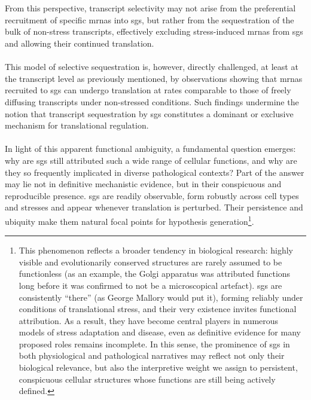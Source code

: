 \\
\\
From this perspective, transcript selectivity may not arise from the preferential recruitment of specific \glspl{mrna} into \glspl{sg}, but rather from the sequestration of the bulk of non-stress transcripts\cite{glauninger_transcriptome-wide_2025}, effectively excluding stress-induced \glspl{mrna} from \glspl{sg} and allowing their continued translation\cite{glauninger_transcriptome-wide_2025}.
\\
\\
This model of selective sequestration is, however, directly challenged, at least at the transcript level as previously mentioned, by observations showing that \glspl{mrna} recruited to \glspl{sg} can undergo translation at rates comparable to those of freely diffusing transcripts under non-stressed conditions\cite{mateju_single-molecule_2020}. Such findings undermine the notion that transcript sequestration by \glspl{sg} constitutes a dominant or exclusive mechanism for translational regulation\cite{glauninger_stressful_2022}.
\\
\\
In light of this apparent functional ambiguity, a fundamental question emerges: why are \glspl{sg} still attributed such a wide range of cellular functions, and why are they so frequently implicated in diverse pathological contexts? Part of the answer may lie not in definitive mechanistic evidence, but in their conspicuous and reproducible presence. \glspl{sg} are readily observable, form robustly across cell types and stresses and appear whenever translation is perturbed. Their persistence and ubiquity make them natural focal points for hypothesis generation\footnote{This phenomenon reflects a broader tendency in biological research: highly visible and evolutionarily conserved structures are rarely assumed to be functionless (as an example, the Golgi apparatus was attributed functions long before it was confirmed to not be a microscopical artefact\cite{mazzarello_how_2009}). \glspl{sg} are consistently “there” (as George Mallory would put it), forming reliably under conditions of translational stress, and their very existence invites functional attribution. As a result, they have become central players in numerous models of stress adaptation and disease, even as definitive evidence for many proposed roles remains incomplete\cite{glauninger_stressful_2022}. In this sense, the prominence of \glspl{sg} in both physiological and pathological narratives may reflect not only their biological relevance, but also the interpretive weight we assign to persistent, conspicuous cellular structures whose functions are still being actively defined.}.


